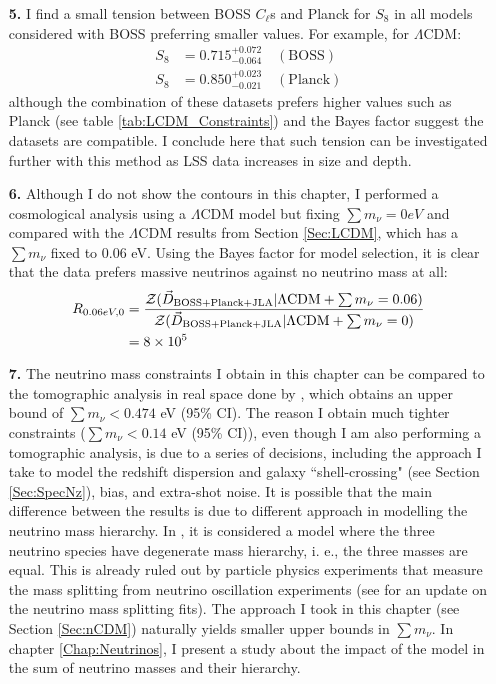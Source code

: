 \begin{itemize}
\item[\textbf{5.}] I find a small tension between BOSS $C_{\ell}$s and Planck for $S_8$ in all models considered with BOSS preferring smaller values. For example, for $\Lambda$CDM: 
\begin{align*}
S_8 & = 0.715^{+0.072}_{-0.064} \quad(\text{BOSS}) \\ \nonumber
S_8 &  = 0.850^{+0.023}_{-0.021}\quad(\text{Planck}) \nonumber
\end{align*}
although the combination of these datasets prefers higher values such as Planck (see table \ref{tab:LCDM_Constraints}) and the Bayes factor suggest the datasets are compatible. I conclude here that such tension can be investigated further with this method as LSS data increases in size and depth.

\item[\textbf{6.}] Although I do not show the contours in this chapter, I performed a cosmological analysis using a $\Lambda$CDM model but fixing $\sum m_{\nu} = 0 eV$ and compared with the $\Lambda$CDM results from Section \ref{Sec:LCDM}, which has a $\sum m_{\nu}$ fixed to $0.06$ eV. Using the Bayes factor for model selection, it is clear that the data prefers massive neutrinos against no neutrino mass at all:
\begin{align}
R_{0.06 eV, 0} & = \frac{\mathcal{Z}(\vec{D}_{\tiny\text{BOSS+Planck+JLA}}| \Lambda\text{CDM} + \sum m_{\nu} = 0.06)}{\mathcal{Z}(\vec{D}_{\tiny\text{BOSS+Planck+JLA}}| \Lambda\text{CDM} + \sum m_{\nu} = 0)} \nonumber \\
& = 8 \times 10^5 \nonumber
\end{align}

\item[\textbf{7.}] The neutrino mass constraints I obtain in this chapter can be compared to the tomographic analysis in real space done by \cite{2017SalazarBOSSwTheta}, which obtains an upper bound of $\sum m_{\nu} < 0.474$ eV (95\% CI). The reason I obtain much tighter constraints ($\sum m_{\nu} < 0.14$ eV (95\% CI)), even though I am also performing a tomographic analysis, is due to a series of decisions, including the approach I take to model the redshift dispersion and galaxy ``shell-crossing" (see Section \ref{Sec:SpecNz}), bias, and extra-shot noise. It is possible that the main difference between the results is due to different approach in modelling the neutrino mass hierarchy. In \cite{2017SalazarBOSSwTheta}, it is considered a model where the three neutrino species have degenerate mass hierarchy, i. e., the three masses are equal. This is already ruled out by particle physics experiments that measure the mass splitting from neutrino oscillation experiments (see \citealt{2014Gonzalez-GarciaNeutrino} for an update on the neutrino mass splitting fits). The approach I took in this chapter (see Section \ref{Sec:nCDM}) naturally yields smaller upper bounds in $\sum m_{\nu}$. In chapter \ref{Chap:Neutrinos}, I present a study about the impact of the model in the sum of neutrino masses and their hierarchy.

\end{itemize}


